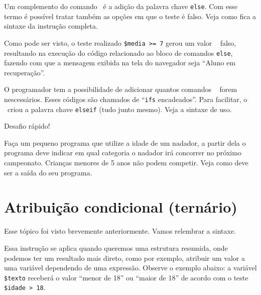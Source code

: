 Um complemento do comando \comandoif~é a adição da palavra chave \texttt{else}. Com esse termo
é possível tratar também as opções em que o teste é falso. Veja como fica a sintaxe da instrução
completa.



Como pode ser visto, o teste realizado \texttt{\$media >= 7} gerou um valor \booleano~
falso, resultando na execução do código relacionado ao bloco de comandos \texttt{else},
fazendo com que a mensagem exibida na tela do navegador seja ``Aluno em recuperação''.

O programador tem a possibilidade de adicionar quantos comandos \comandoifelse~
forem nescessários. Esses códigos são chamados de ``\texttt{ifs} encadeados''. 
Para facilitar, o \php~criou a palavra chave \texttt{elseif} (tudo junto mesmo).
Veja a sintaxe de uso.



{\Large Desafio rápido!}

Faça um pequeno programa que utilize a idade de um nadador, a partir dela
o programa deve indicar em qual categoria o nadador irá concorrer no próximo
campeonato. Crianças menores de 5 anos não podem competir. 
Veja como deve ser a saída do seu programa. 


\section{Atribuição condicional (ternário)}
\label{atribuicao-condicional}

Esse tópico foi visto brevemente anteriormente. Vamos relembrar a sintaxe.



Essa instrução se aplica quando queremos uma estrutura resumida, onde podemos ter um 
resultado mais direto, como por exemplo, atribuir um valor a uma variável dependendo de uma
expressão. Observe o exemplo abaixo: a variável \texttt{\$texto} receberá o valor 
``menor de 18'' ou ``maior de 18'' de acordo com o teste \texttt{\$idade > 18}.


 
